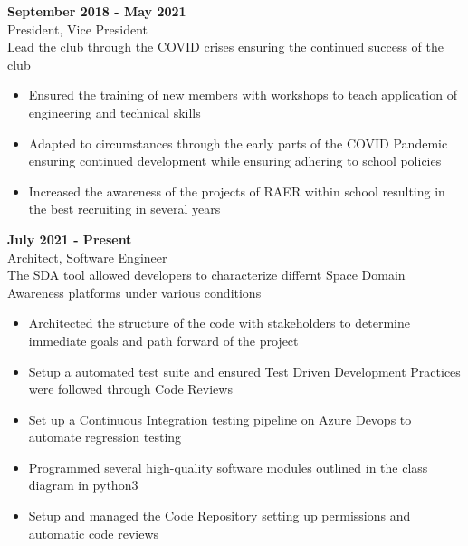 \documentclass[10pt]{article}
\newcommand{\entrySpacing}{4pt}
\begin{document}
\noindent\begin{minipage}{\linewidth}
 \hfill \textbf{September 2018 - May 2021}\\
President, Vice President\hfill \\Lead the club through the COVID crises ensuring the continued success of the club
\begin{itemize}[noitemsep,nolistsep]
\item Ensured the training of new members with workshops to teach application of engineering and technical skills
\item Adapted to circumstances through the early parts of the COVID  Pandemic ensuring continued development while ensuring adhering to school policies
\item Increased the awareness of the projects of RAER within school resulting in the best recruiting in several years
\end{itemize}


\end{minipage}
\vspace{\entrySpacing}

\noindent\begin{minipage}{\linewidth}
 \hfill \textbf{July 2021 - Present}\\
Architect, Software Engineer\hfill \\The SDA tool allowed developers to characterize differnt Space Domain Awareness platforms under various conditions
\begin{itemize}[noitemsep,nolistsep]
\item Architected the structure of the code with stakeholders to determine immediate goals and path forward of the project
\item Setup a automated test suite and ensured Test Driven Development Practices were followed through Code Reviews
\item Set up a Continuous Integration testing pipeline on Azure Devops to automate regression testing
\item Programmed several high-quality software modules outlined in the class diagram in python3
\item Setup and managed the Code Repository setting up permissions and automatic code reviews
\end{itemize}


\end{minipage}
\vspace{\entrySpacing}
\end{document}
